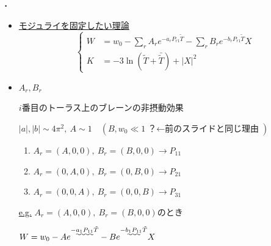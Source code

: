 \documentclass[
  a4paper,uplatex,dvipdfmx,9pt,
  xcolor = {dvipsnames,svgnames},
  hyperref ={colorlinks=true,citecolor=Navy,linkcolor=NavyBlue,urlcolor=purple}
]{beamer}
\begin{document}
\begin{frame}
  \frametitle{\thesection.\thesubsection\ \subsecname}


  \vspace*{-1cm}

  \begin{itemize}
    \item 
    \uline{モジュライを固定したい理論}
    \begin{equation}
      \left\{
        \begin{alignedat}{1}
          W
          &=
          w_{0}
          -
          \sum_{r}
          A_{r}
          e^{-a_{r}P_{r1}\tilde{T}}
          -
          \sum_{r}B_{r}e^{-b_{r}P_{r1}\tilde{T}}
          X
          \\
          K
          &=
          -
          3\ln (\tilde{T}+\bar{\tilde{T}})
          +
          |X|^2
        \end{alignedat}
      \right.
      \nonumber
    \end{equation}
    \item
    \uline{$A_{r},B_{r}$}
  
    $i$番目のトーラス上のブレーンの非摂動効果\cite{Dine_SupersymmetryString_2023}
    \begin{center}
      $
        |a|,|b|\sim 4\pi^2
        ,\ 
        A\sim 1
        \quad
        (B,w_{0}\ll 1\text{？$\leftarrow$前のスライドと同じ理由})
      $
    \end{center}
    \begin{enumerate}
      \item 
      $A_{r}=(A,0,0),\ B_{r}=(B,0,0)\rightarrow P_{11}$
      \item 
      $A_{r}=(0,A,0),\ B_{r}=(0,B,0)\rightarrow P_{21}$
      \item 
      $A_{r}=(0,0,A),\ B_{r}=(0,0,B)\rightarrow P_{31}$
    \end{enumerate}

    \item[\uline{\textcolor{black}{e.g.}}]
    $A_{r}=(A,0,0),\ B_{r}=(B,0,0)$のとき
    \begin{center}
      $
        \displaystyle
        W
        =
        w_{0}
        -
        A
        e^{-\uwave{a_{1}P_{11}}\tilde{T}}
        -
        Be^{-\uwave{b_{1}P_{11}}\tilde{T}}
        X
      $


\end{center}
\end{itemize}
\end{frame}
\end{document}
